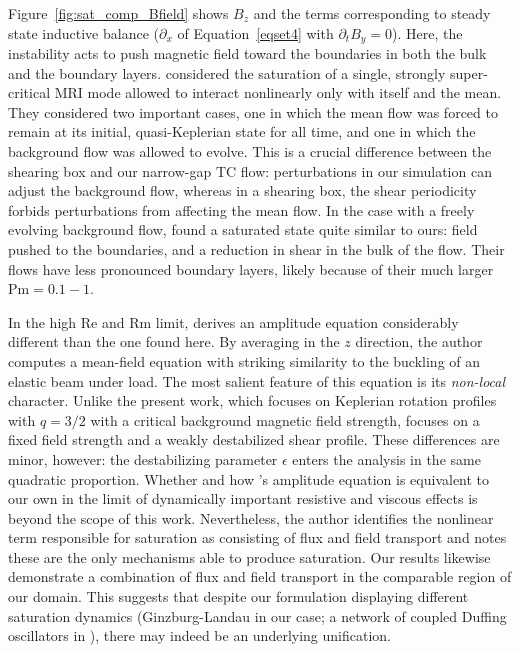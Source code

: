 \documentclass[twocolumn]{aastex61}
\newcommand\reye{\mathrm{Re}}
\newcommand\reym{\mathrm{Rm}}
\newcommand{\Pm}{\mathrm{Pm}}
\begin{document}
Figure~\ref{fig:sat_comp_Bfield} shows $B_z$ and the terms corresponding to steady state inductive balance ($\partial_x$ of Equation~\ref{eqset4} with $\partial_t B_{y} = 0$). Here, the instability acts to push magnetic field toward the boundaries in both the bulk and the boundary layers. %
 \citet{Ebrahimi:2009ey} considered the saturation of a single, strongly super-critical MRI mode allowed to interact nonlinearly only with itself and the mean. They considered two important cases, one in which the mean flow was forced to remain at its initial, quasi-Keplerian state for all time, and one in which the background flow was allowed to evolve. This is a crucial difference between the shearing box and our narrow-gap TC flow: perturbations in our simulation can adjust the background flow, whereas in a shearing box, the shear periodicity forbids perturbations from affecting the mean flow. In the case with a freely evolving background flow, \citet{Ebrahimi:2009ey} found a saturated state quite similar to ours: field pushed to the boundaries, and a reduction in shear in the bulk of the flow. Their flows have less pronounced boundary layers, likely because of their much larger $\Pm = 0.1 -1$. 

In the high $\reye$ and  $\reym$  limit, \citet{Vasil:2015} derives an amplitude equation considerably different than the one found here. By averaging in the $z$ direction, the author computes a mean-field equation with striking similarity to the buckling of an elastic beam under load. The most salient feature of this equation is its \emph{non-local} character. Unlike the present work, which focuses on Keplerian rotation profiles with $q = 3/2$ with a critical background magnetic field strength, \citet{Vasil:2015} focuses on a fixed field strength and a weakly destabilized shear profile. These differences are minor, however: the destabilizing parameter $\epsilon$ enters the analysis in the same quadratic proportion. Whether and how \citet{Vasil:2015}'s amplitude equation is equivalent to our own in the limit of dynamically important resistive and viscous effects is beyond the scope of this work. Nevertheless, the author identifies the nonlinear term responsible for saturation as consisting of flux and field transport and notes these are the only mechanisms able to produce saturation. Our results likewise demonstrate a combination of flux and field transport in the comparable region of our domain. This suggests that despite our formulation displaying different saturation dynamics (Ginzburg-Landau in our case; a network of coupled Duffing oscillators in \citeauthor{Vasil:2015} \citeyear{Vasil:2015}), there may indeed be an underlying unification. 
\end{document}

